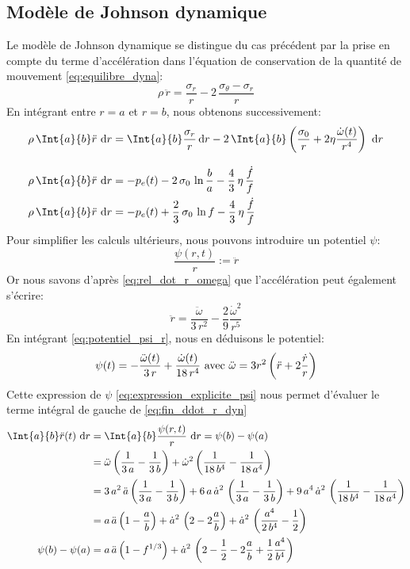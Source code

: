 \documentclass[10pt]{book}
\begin{document}
\subsection{Modèle de Johnson dynamique}
Le modèle de Johnson dynamique se distingue du cas précédent par la prise en compte du terme d’accélération dans l'équation de conservation de la quantité de mouvement \eqref{eq:equilibre_dyna}:
$$\rho\,\ddot{r}  = \dfrac{\sigma_r}{r} -2\, \dfrac{\sigma_\theta-\sigma_r}{r}$$
En intégrant entre $r=a$ et $r=b$, nous obtenons successivement:
\begin{align} 
\rho \, \Int{a}{b} \ddot{r} \, \dr & =\Int{a}{b} \dfrac{\sigma_r}{r} \dr -2 \, \Int{a}{b}\pa{\dfrac{\sigma_0}{r}+2 \eta \dfrac{\dot{\omega}(t)}{r^4} }\, \dr \\[3mm]
\rho \, \Int{a}{b} \ddot{r} \,  \dr & = -p_e(t) - 2 \,\sigma_0 \,\ln{\dfrac{b}{a}} - \dfrac{4}{3}\,\eta\,\dfrac{\dot{f}}{f}\\
\rho \, \Int{a}{b}\ddot{r} \,  \dr & = -p_e(t) + \dfrac{2}{3} \,\sigma_0 \,\ln{f} - \dfrac{4}{3}\,\eta\,\dfrac{\dot{f}}{f} \label{eq:fin_ddot_r_dyn}
\end{align}
Pour simplifier les calculs ultérieurs, nous pouvons introduire un potentiel $\psi$:
\begin{equation}
\dfrac{\psi(r,t)}{r}:=\ddot{r}
\label{eq:potentiel_psi_r}
\end{equation}
Or nous savons d'après \eqref{eq:rel_dot_r_omega} que l’accélération peut également s'écrire:
$$\ddot{r}=\dfrac{\ddot{\omega}}{3\,r^2}-\dfrac{2}{9}\dfrac{\dot{\omega}^2}{r^5}$$
En intégrant \eqref{eq:potentiel_psi_r}, nous en déduisons le potentiel: 
\begin{equation}
\psi(t)=-\dfrac{\ddot{\omega}(t)}{3\,r}+\dfrac{\dot{\omega}(t)}{18\,r^4} \text{ avec } \ddot{\omega}=3r^2\left(\ddot{r}+2\dfrac{\dot{r}}{r}\right)
\label{eq:expression_explicite_psi}
\end{equation}
Cette expression de $\psi$ \eqref{eq:expression_explicite_psi} nous permet d'évaluer le terme intégral de gauche de \eqref{eq:fin_ddot_r_dyn}
$$\begin{aligned}
\Int{a}{b} \ddot{r}(t)\,  \dr &= \Int{a}{b}\dfrac{\psi(r,t)}{r} \,  \dr = \psi(b)-\psi(a)\\
&= \ddot{\omega}\pa{\dfrac{1}{3\,a}-\dfrac{1}{3\,b}}+\dot{\omega}^2\pa{\dfrac{1}{18\,b^4}-\dfrac{1}{18\,a^4}}\\
&= 3\,a^2\,\ddot{a}\pa{\dfrac{1}{3\,a}-\dfrac{1}{3\,b}}+6\,a\,\dot{a}^2\,\pa{\dfrac{1}{3\,a}-\dfrac{1}{3\,b}}+9\,a^4\,\dot{a}^2\,\pa{\dfrac{1}{18\,b^4}-\dfrac{1}{18\,a^4}}\\
&= a\,\ddot{a}\pa{1-\dfrac{a}{b}}+\dot{a}^2\,\pa{2-2\dfrac{a}{b}}+\dot{a}^2\,\pa{\dfrac{a^4}{2\,b^4}-\dfrac{1}{2}}\\
\psi(b)-\psi(a) &= a\,\ddot{a}\pa{1-f^{1/3}}+\dot{a}^2\,\pa{2-\dfrac{1}{2}-2\dfrac{a}{b}+\dfrac{1}{2}\dfrac{a^4}{b^4}}
\end{aligned}$$
\end{document}

